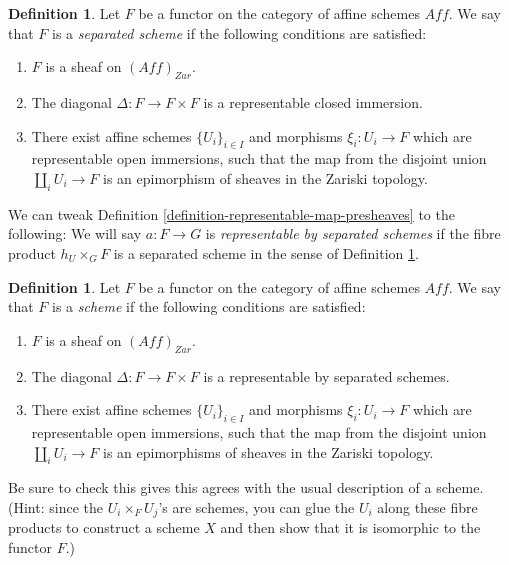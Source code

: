 \documentclass[11pt]{amsart}
\theoremstyle{definition}
\newtheorem{definition}[theorem]{Definition}
\begin{document}
\begin{definition}\label{separated-scheme}
	Let $F$ be a functor on the category of affine schemes $\mathit{Aff}$. We say that $F$ is a \textit{separated scheme} if the following conditions are satisfied:
	\begin{enumerate}
		\item $F$ is a sheaf on $(\mathit{Aff})_{\textit{Zar}}$.
		\item The diagonal $\Delta: F\rightarrow F\times F$ is a representable closed immersion.
		\item There exist affine schemes $\{U_i\}_{i\in I}$ and morphisms $\xi_i: U_i\rightarrow F$ which are representable open immersions, such that the map from the disjoint union $\amalg_i U_i\rightarrow F$ is an epimorphism of sheaves in the Zariski topology.
	\end{enumerate}
\end{definition}

We can tweak Definition \ref{definition-representable-map-presheaves} to the following: We will say $a: F\rightarrow G$ is \textit{representable by separated schemes} if the fibre product $h_U\times_G F$ is a separated scheme in the sense of Definition \ref{separated-scheme}.

\begin{definition}\label{scheme}
		Let $F$ be a functor on the category of affine schemes $\mathit{Aff}$. We say that $F$ is a \textit{scheme} if the following conditions are satisfied:
	\begin{enumerate}
		\item $F$ is a sheaf on $(\mathit{Aff})_{\textit{Zar}}$.
		\item The diagonal $\Delta: F\rightarrow F\times F$ is a representable by separated schemes.
		\item There exist affine schemes $\{U_i\}_{i\in I}$ and morphisms $\xi_i: U_i\rightarrow F$ which are representable open immersions, such that the map from the disjoint union $\amalg_i U_i\rightarrow F$ is an epimorphisms of sheaves in the Zariski topology.
	\end{enumerate}
\end{definition}

Be sure to check this gives this agrees with the usual description of a scheme. (Hint: since the $U_i\times_F U_j$'s are schemes, you can glue the $U_i$ along these fibre products to construct a scheme $X$ and then show that it is isomorphic to the functor $F$.)
\end{document}
